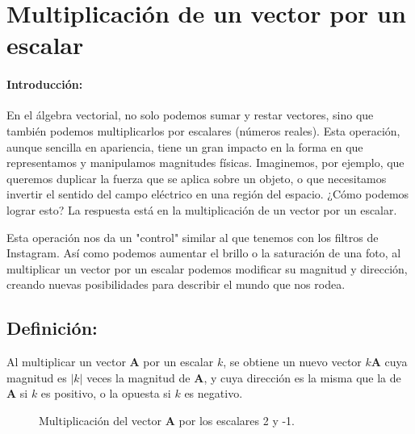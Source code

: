 \documentclass{book}
\begin{document}

\section{Multiplicación de un vector por un escalar}

\paragraph{Introducción:}

En el álgebra vectorial, no solo podemos sumar y restar vectores, sino que también podemos multiplicarlos por escalares (números reales). Esta operación, aunque sencilla en apariencia, tiene un gran impacto en la forma en que representamos y manipulamos magnitudes físicas. Imaginemos, por ejemplo, que queremos duplicar la fuerza que se aplica sobre un objeto, o que necesitamos invertir el sentido del campo eléctrico en una región del espacio. ¿Cómo podemos lograr esto? La respuesta está en la multiplicación de un vector por un escalar.

Esta operación nos da un "control" similar al que tenemos con los filtros de Instagram. Así como podemos aumentar el brillo o la saturación de una foto, al multiplicar un vector por un escalar podemos modificar su magnitud y dirección, creando nuevas posibilidades para describir el mundo que nos rodea.

\subsection{Definición:}

Al multiplicar un vector $\mathbf{A}$ por un escalar $k$, se obtiene un nuevo vector $k\mathbf{A}$ cuya magnitud es $|k|$ veces la magnitud de $\mathbf{A}$, y cuya dirección es la misma que la de $\mathbf{A}$ si $k$ es positivo, o la opuesta si $k$ es negativo.

\begin{figure}[H]
\centering
{}
\caption{Multiplicación del vector $\mathbf{A}$ por los escalares 2 y -1.}
\label{fig:multiplicacion_escalar}
\end{figure}
\end{document}
